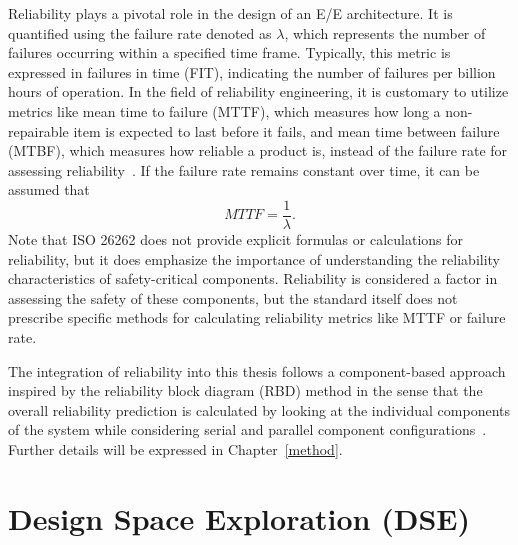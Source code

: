     Reliability plays a pivotal role in the design of an E/E architecture. It is quantified using the failure rate denoted as $\lambda$, which represents the number of failures occurring within a specified time frame. Typically, this metric is expressed in failures in time (FIT), indicating the number of failures per billion hours of operation. In the field of reliability engineering, it is customary to utilize metrics like mean time to failure (MTTF), which measures how long a non-repairable item is expected to last before it fails, and mean time between failure (MTBF), which measures how reliable a product is, instead of the failure rate for assessing reliability~\cite{international2017electric}. If the failure rate remains constant over time, it can be assumed that
    \begin{equation}
    MTTF = \frac{1}{\lambda}.
    \end{equation}
    Note that ISO 26262 does not provide explicit formulas or calculations for reliability, but it does emphasize the importance of understanding the reliability characteristics of safety-critical components. Reliability is considered a factor in assessing the safety of these components, but the standard itself does not prescribe specific methods for calculating reliability metrics like MTTF or failure rate. 
    
    The integration of reliability into this thesis follows a component-based approach inspired by the reliability block diagram (RBD) method in the sense that the overall reliability prediction is calculated by looking at the individual components of the system while considering serial and parallel component configurations~\cite{IEC61508, international2017electric}. Further details will be expressed in Chapter~\ref{method}.
    
    \section{Design Space Exploration (DSE)}
    
